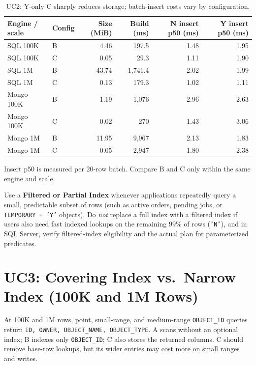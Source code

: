\begin{table}[H]
\centering\small
\caption{UC2: Y-only C sharply reduces storage; batch-insert costs vary by configuration.}
\label{tab:uc2-tradeoff}
\begin{tabular}{@{}l l r r r r@{}}
\toprule
Engine / scale & Config & Size (MiB) & Build (ms) & N insert p50 (ms) & Y insert p50 (ms)\\
\midrule
SQL 100K & B & 4.46 & 197.5 & 1.48 & 1.95\\
SQL 100K & C & 0.05 & 29.3 & 1.11 & 1.90\\
SQL 1M & B & 43.74 & 1,741.4 & 2.02 & 1.99\\
SQL 1M & C & 0.13 & 179.3 & 1.02 & 1.11\\
\midrule
Mongo 100K & B & 1.19 & 1,076 & 2.96 & 2.63\\
Mongo 100K & C & 0.02 & 270 & 1.43 & 3.06\\
Mongo 1M & B & 11.95 & 9,967 & 2.13 & 1.83\\
Mongo 1M & C & 0.05 & 2,947 & 1.80 & 2.38\\
\bottomrule
\end{tabular}
\par\smallskip\scriptsize\raggedright Insert p50 is measured per 20-row batch. Compare B and C only within the same engine and scale.\par
\end{table}

Use a \textbf{Filtered or Partial Index} whenever applications repeatedly query a small, predictable subset of rows (such as active orders, pending jobs, or \texttt{TEMPORARY = 'Y'} objects). Do \emph{not} replace a full index with a filtered index if users also need fast indexed lookups on the remaining $99\%$ of rows (\texttt{'N'}), and in SQL Server, verify filtered-index eligibility and the actual plan for parameterized predicates.

\FloatBarrier
\section{UC3: Covering Index vs.\ Narrow Index (100K and 1M Rows)}

At 100K and 1M rows, point, small-range, and medium-range \texttt{OBJECT\_ID} queries return \texttt{ID, OWNER, OBJECT\_NAME, OBJECT\_TYPE}. A scans without an optional index; B indexes only \texttt{OBJECT\_ID}; C also stores the returned columns. C should remove base-row lookups, but its wider entries may cost more on small ranges and writes.

